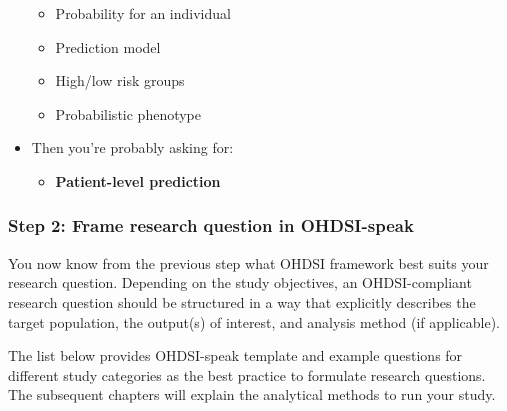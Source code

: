\documentclass[11pt]{book}
\providecommand{\tightlist}{%
  \setlength{\itemsep}{0pt}\setlength{\parskip}{0pt}}
\theoremstyle{definition}
\theoremstyle{definition}
\theoremstyle{definition}
\theoremstyle{remark}
\begin{document}
\begin{itemize}
  \begin{itemize}
  \tightlist
  \item
    Probability for an individual
  \item
    Prediction model
  \item
    High/low risk groups
  \item
    Probabilistic phenotype
  \end{itemize}
\item
  Then you're probably asking for:

  \begin{itemize}
  \tightlist
  \item
    \textbf{Patient-level prediction}
  \end{itemize}
\end{itemize}

\hypertarget{step-2-frame-research-question-in-ohdsi-speak}{%
\subsubsection{Step 2: Frame research question in OHDSI-speak}\label{step-2-frame-research-question-in-ohdsi-speak}}

You now know from the previous step what OHDSI framework best suits your research question. Depending on the study objectives, an OHDSI-compliant research question should be structured in a way that explicitly describes the target population, the output(s) of interest, and analysis method (if applicable).

The list below provides OHDSI-speak template and example questions for different study categories as the best practice to formulate research questions. The subsequent chapters will explain the analytical methods to run your study.
\end{document}
